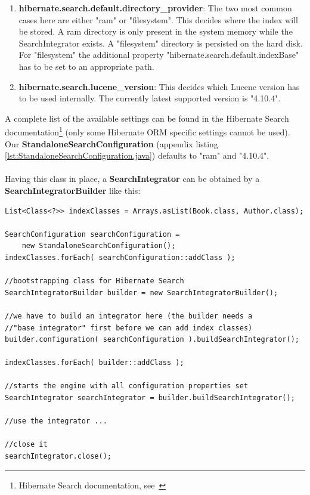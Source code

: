 \begin{enumerate}
	\item \textbf{hibernate.search.default.directory\_provider}: The two most common cases here are either "ram" or "filesystem". This decides where the index will be stored. A ram directory is only present in the system memory while the SearchIntegrator exists. A "filesystem" directory is persisted on the hard disk. For "filesystem" the additional property "hibernate.search.default.indexBase" has to be set to an appropriate path.
	
	\item \textbf{hibernate.search.lucene\_version}: This decides which Lucene version has to be used internally. The currently latest supported version is "4.10.4".
\end{enumerate}
\noindent
A complete list of the available settings can be found in the Hibernate Search documentation\footnote{Hibernate Search documentation, see~\cite{hibernate_search_doc}} (only some Hibernate ORM specific settings cannot be used). Our \textbf{StandaloneSearchConfiguration} (appendix listing \ref{lst:StandaloneSearchConfiguration.java}) defaults to "ram" and "4.10.4".
\\\\
Having this class in place, a \textbf{SearchIntegrator} can be obtained by a \textbf{SearchIntegratorBuilder} like this:
\\
\lstset{language=java}
\begin{lstlisting}[frame=htrbl, caption={Starting up the engine}, label={lst:starting_up_engine.java}]
List<Class<?>> indexClasses = Arrays.asList(Book.class, Author.class);

SearchConfiguration searchConfiguration = 
	new StandaloneSearchConfiguration();
indexClasses.forEach( searchConfiguration::addClass );

//bootstrapping class for Hibernate Search
SearchIntegratorBuilder builder = new SearchIntegratorBuilder();

//we have to build an integrator here (the builder needs a 
//"base integrator" first before we can add index classes)
builder.configuration( searchConfiguration ).buildSearchIntegrator();

indexClasses.forEach( builder::addClass );

//starts the engine with all configuration properties set
SearchIntegrator searchIntegrator = builder.buildSearchIntegrator();

//use the integrator ...

//close it
searchIntegrator.close();
\end{lstlisting}

